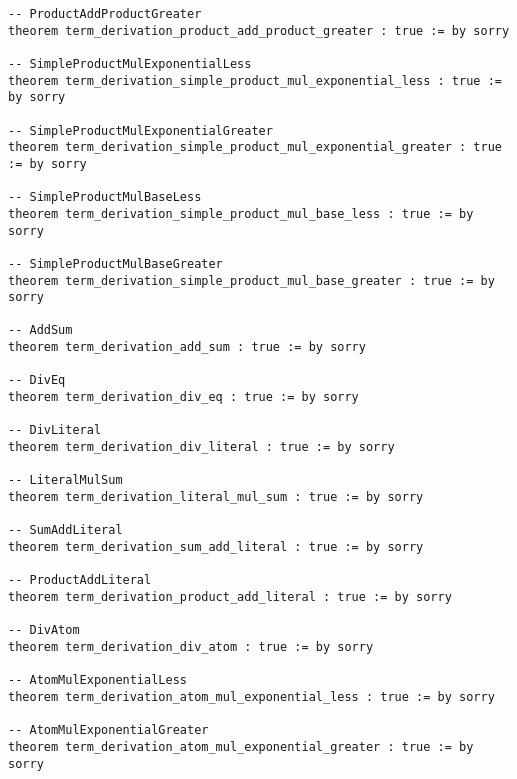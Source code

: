 \documentclass{article}
\begin{document}
\begin{tcolorbox}[colback=white!10, width=\linewidth]
\begin{lstlisting}[language=Lean4]
-- ProductAddProductGreater
theorem term_derivation_product_add_product_greater : true := by sorry

-- SimpleProductMulExponentialLess
theorem term_derivation_simple_product_mul_exponential_less : true := by sorry

-- SimpleProductMulExponentialGreater
theorem term_derivation_simple_product_mul_exponential_greater : true := by sorry

-- SimpleProductMulBaseLess
theorem term_derivation_simple_product_mul_base_less : true := by sorry

-- SimpleProductMulBaseGreater
theorem term_derivation_simple_product_mul_base_greater : true := by sorry

-- AddSum
theorem term_derivation_add_sum : true := by sorry

-- DivEq
theorem term_derivation_div_eq : true := by sorry

-- DivLiteral
theorem term_derivation_div_literal : true := by sorry

-- LiteralMulSum
theorem term_derivation_literal_mul_sum : true := by sorry

-- SumAddLiteral
theorem term_derivation_sum_add_literal : true := by sorry

-- ProductAddLiteral
theorem term_derivation_product_add_literal : true := by sorry

-- DivAtom
theorem term_derivation_div_atom : true := by sorry

-- AtomMulExponentialLess
theorem term_derivation_atom_mul_exponential_less : true := by sorry

-- AtomMulExponentialGreater
theorem term_derivation_atom_mul_exponential_greater : true := by sorry



\end{lstlisting}
\end{tcolorbox}
\end{document}
